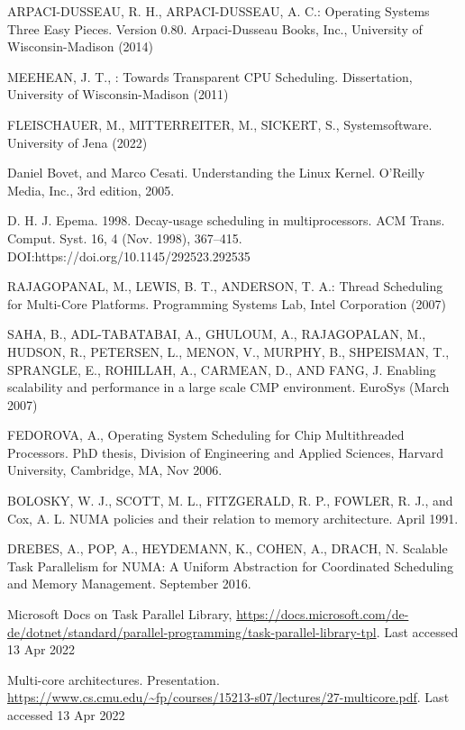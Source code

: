 \documentclass[runningheads]{llncs}
\begin{document}
\begin{thebibliography}{8}

ARPACI-DUSSEAU, R. H., ARPACI-DUSSEAU, A. C.: Operating Systems Three Easy Pieces. Version 0.80. Arpaci-Dusseau Books, Inc.,
University of Wisconsin-Madison (2014)

MEEHEAN, J. T., : Towards Transparent CPU Scheduling. Dissertation,
University of Wisconsin-Madison (2011)

FLEISCHAUER, M., MITTERREITER, M., SICKERT, S., Systemsoftware.
University of Jena (2022)

Daniel Bovet, and Marco Cesati. Understanding the Linux Kernel. O’Reilly
Media, Inc., 3rd edition, 2005.

D. H. J. Epema. 1998. Decay-usage scheduling in multiprocessors. ACM Trans. Comput. Syst. 16, 4 (Nov. 1998), 367–415. DOI:https://doi.org/10.1145/292523.292535

RAJAGOPANAL, M., LEWIS, B. T., ANDERSON, T. A.: Thread Scheduling for Multi-Core Platforms. Programming Systems Lab, Intel Corporation (2007)

SAHA, B., ADL-TABATABAI, A., GHULOUM, A., RAJAGOPALAN,
M., HUDSON, R., PETERSEN, L., MENON, V.,
MURPHY, B., SHPEISMAN, T., SPRANGLE, E., ROHILLAH, A.,
CARMEAN, D., AND FANG, J. Enabling scalability and performance
in a large scale CMP environment. EuroSys (March 2007)

FEDOROVA, A., Operating System Scheduling for Chip Multithreaded
Processors. PhD thesis, Division of Engineering and
Applied Sciences, Harvard University, Cambridge, MA, Nov
2006.

BOLOSKY, W. J., SCOTT, M. L., FITZGERALD, R. P., FOWLER, R. J., and Cox, A. L.
NUMA policies and their relation to memory
architecture. April 1991.

DREBES, A., POP, A., HEYDEMANN, K., COHEN, A., DRACH, N.
Scalable Task Parallelism for NUMA: A Uniform Abstraction
for Coordinated Scheduling and Memory Management. September 2016.

Microsoft Docs on Task Parallel Library, \url{https://docs.microsoft.com/de-de/dotnet/standard/parallel-programming/task-parallel-library-tpl}. 
Last accessed 13 Apr 2022

Multi-core architectures. Presentation. \url{https://www.cs.cmu.edu/~fp/courses/15213-s07/lectures/27-multicore.pdf}. 
Last accessed 13 Apr 2022


\end{thebibliography}
\end{document}
